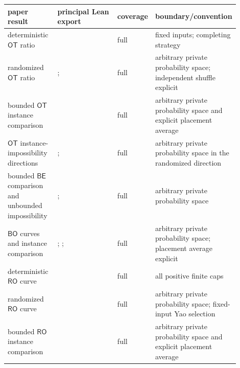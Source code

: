 \begin{center}
\scriptsize
\renewcommand{\arraystretch}{1.1}
\begin{longtable}{@{}L{0.22\linewidth}L{0.31\linewidth}L{0.12\linewidth}L{0.25\linewidth}@{}}
\toprule
paper result & principal Lean export & coverage & boundary/convention \\
\midrule
deterministic $\mathsf{OT}$ ratio
 &  & full
 & fixed inputs; completing strategy \\
randomized $\mathsf{OT}$ ratio
 & ;
 & full
 & arbitrary private probability space; independent shuffle explicit \\
bounded $\mathsf{OT}$ instance comparison
 & 
 & full
 & arbitrary private probability space and explicit placement average \\
$\mathsf{OT}$ instance-impossibility directions
 & ;
 & full
 & arbitrary private probability space in the randomized direction \\
bounded $\mathsf{BE}$ comparison and unbounded impossibility
 & ;
 & full
 & arbitrary private probability space \\
$\mathsf{BO}$ curves and instance comparison
 & ;
   ;
 & full
 & arbitrary private probability space; placement average explicit \\
deterministic $\mathsf{RO}$ curve
 &  & full
 & all positive finite caps \\
randomized $\mathsf{RO}$ curve
 & 
 & full
 & arbitrary private probability space; fixed-input Yao selection \\
bounded $\mathsf{RO}$ instance comparison
 & 
 & full
 & arbitrary private probability space and explicit placement average \\
\bottomrule
\end{longtable}
\end{center}

